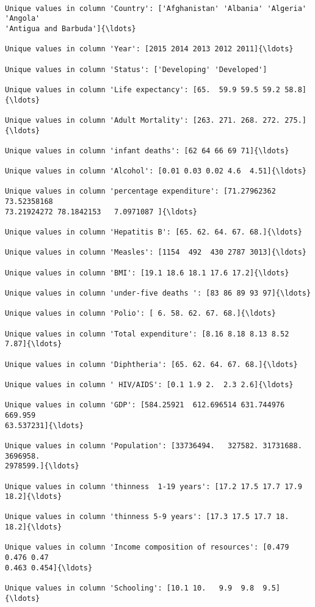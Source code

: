 \documentclass[11pt]{article}
\begin{document}
    \begin{Verbatim}[commandchars=\\\{\}]

Unique values in column 'Country': ['Afghanistan' 'Albania' 'Algeria' 'Angola'
'Antigua and Barbuda']{\ldots}

Unique values in column 'Year': [2015 2014 2013 2012 2011]{\ldots}

Unique values in column 'Status': ['Developing' 'Developed']

Unique values in column 'Life expectancy': [65.  59.9 59.5 59.2 58.8]{\ldots}

Unique values in column 'Adult Mortality': [263. 271. 268. 272. 275.]{\ldots}

Unique values in column 'infant deaths': [62 64 66 69 71]{\ldots}

Unique values in column 'Alcohol': [0.01 0.03 0.02 4.6  4.51]{\ldots}

Unique values in column 'percentage expenditure': [71.27962362 73.52358168
73.21924272 78.1842153   7.0971087 ]{\ldots}

Unique values in column 'Hepatitis B': [65. 62. 64. 67. 68.]{\ldots}

Unique values in column 'Measles': [1154  492  430 2787 3013]{\ldots}

Unique values in column 'BMI': [19.1 18.6 18.1 17.6 17.2]{\ldots}

Unique values in column 'under-five deaths ': [83 86 89 93 97]{\ldots}

Unique values in column 'Polio': [ 6. 58. 62. 67. 68.]{\ldots}

Unique values in column 'Total expenditure': [8.16 8.18 8.13 8.52 7.87]{\ldots}

Unique values in column 'Diphtheria': [65. 62. 64. 67. 68.]{\ldots}

Unique values in column ' HIV/AIDS': [0.1 1.9 2.  2.3 2.6]{\ldots}

Unique values in column 'GDP': [584.25921  612.696514 631.744976 669.959
63.537231]{\ldots}

Unique values in column 'Population': [33736494.   327582. 31731688.  3696958.
2978599.]{\ldots}

Unique values in column 'thinness  1-19 years': [17.2 17.5 17.7 17.9 18.2]{\ldots}

Unique values in column 'thinness 5-9 years': [17.3 17.5 17.7 18.  18.2]{\ldots}

Unique values in column 'Income composition of resources': [0.479 0.476 0.47
0.463 0.454]{\ldots}

Unique values in column 'Schooling': [10.1 10.   9.9  9.8  9.5]{\ldots}
    \end{Verbatim}
\end{document}
